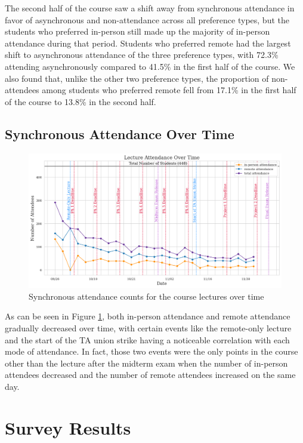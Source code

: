 The second half of the course saw a shift away from synchronous attendance in favor of asynchronous and non-attendance across all preference types, but the students who preferred in-person still made up the majority of in-person attendance during that period. Students who preferred remote had the largest shift to asynchronous attendance of the three preference types, with 72.3\% attending asynchronously compared to 41.5\% in the first half of the course. We also found that, unlike the other two preference types, the proportion of non-attendees among students who preferred remote fell from 17.1\% in the first half of the course to 13.8\% in the second half.

\subsection{Synchronous Attendance Over Time}

\begin{figure}[H]
    \vspace{5mm}
    \centering
    \includegraphics[width= 16cm]{figures/attendance_over_time.png}
    \caption{Synchronous attendance counts for the course lectures over time}
    \label{fig:attendance_over_time}
\end{figure}

As can be seen in Figure \ref{fig:attendance_over_time}, both in-person attendance and remote attendance gradually decreased over time, with certain events like the remote-only lecture and the start of the TA union strike having a noticeable correlation with each mode of attendance. In fact, those two events were the only points in the course other than the lecture after the midterm exam when the number of in-person attendees decreased and the number of remote attendees increased on the same day.

\section{Survey Results}

